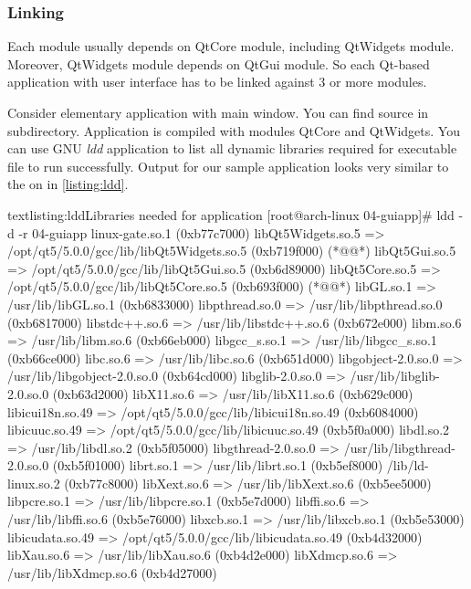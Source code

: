 \subsubsection{Linking}\label{listing:linking}
Each module usually depends on QtCore module, including QtWidgets module. Moreover, QtWidgets module depends on QtGui module. So each Qt-based application with user interface has to be linked against 3 or more modules.

Consider elementary  application with main window. You can find source in subdirectory. Application is compiled with modules QtCore and QtWidgets. You can use GNU \textit{ldd} application to list all dynamic libraries required for executable file to run successfully. Output for our sample application looks very similar to the on in \autoref{listing:ldd}.

\begin{fdoccode}{text}{listing:ldd}{Libraries needed for  application}
[root@arch-linux 04-guiapp]# ldd -d -r 04-guiapp
linux-gate.so.1 (0xb77c7000)
libQt5Widgets.so.5 => /opt/qt5/5.0.0/gcc/lib/libQt5Widgets.so.5 (0xb719f000) (*@\label{listing:qt5w}@*)
libQt5Gui.so.5 => /opt/qt5/5.0.0/gcc/lib/libQt5Gui.so.5 (0xb6d89000)
libQt5Core.so.5 => /opt/qt5/5.0.0/gcc/lib/libQt5Core.so.5 (0xb693f000) (*@\label{listing:qt5c}@*)
libGL.so.1 => /usr/lib/libGL.so.1 (0xb6833000)
libpthread.so.0 => /usr/lib/libpthread.so.0 (0xb6817000)
libstdc++.so.6 => /usr/lib/libstdc++.so.6 (0xb672e000)
libm.so.6 => /usr/lib/libm.so.6 (0xb66eb000)
libgcc_s.so.1 => /usr/lib/libgcc_s.so.1 (0xb66ce000)
libc.so.6 => /usr/lib/libc.so.6 (0xb651d000)
libgobject-2.0.so.0 => /usr/lib/libgobject-2.0.so.0 (0xb64cd000)
libglib-2.0.so.0 => /usr/lib/libglib-2.0.so.0 (0xb63d2000)
libX11.so.6 => /usr/lib/libX11.so.6 (0xb629c000)
libicui18n.so.49 => /opt/qt5/5.0.0/gcc/lib/libicui18n.so.49 (0xb6084000)
libicuuc.so.49 => /opt/qt5/5.0.0/gcc/lib/libicuuc.so.49 (0xb5f0a000)
libdl.so.2 => /usr/lib/libdl.so.2 (0xb5f05000)
libgthread-2.0.so.0 => /usr/lib/libgthread-2.0.so.0 (0xb5f01000)
librt.so.1 => /usr/lib/librt.so.1 (0xb5ef8000)
/lib/ld-linux.so.2 (0xb77c8000)
libXext.so.6 => /usr/lib/libXext.so.6 (0xb5ee5000)
libpcre.so.1 => /usr/lib/libpcre.so.1 (0xb5e7d000)
libffi.so.6 => /usr/lib/libffi.so.6 (0xb5e76000)
libxcb.so.1 => /usr/lib/libxcb.so.1 (0xb5e53000)
libicudata.so.49 => /opt/qt5/5.0.0/gcc/lib/libicudata.so.49 (0xb4d32000)
libXau.so.6 => /usr/lib/libXau.so.6 (0xb4d2e000)
libXdmcp.so.6 => /usr/lib/libXdmcp.so.6 (0xb4d27000)
\end{fdoccode}

